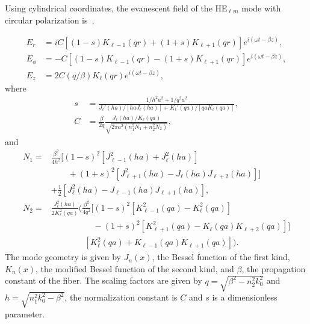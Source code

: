 Using cylindrical coordinates, the evanescent field of the HE$_{\ell m}$ mode with circular polarization is~\cite{minogin2010},

\begin{align}
        E_r &= iC[(1-s)K_{\ell-1}(qr) + (1+s)K_{\ell+1}(qr)]e^{i(\omega t- \beta z)}, \\
        E_\phi &= -C[(1-s)K_{\ell-1}(qr) - (1+s)K_{\ell+1}(qr)]e^{i(\omega t- \beta z)}, \\
        E_z &= 2C(q/\beta)K_\ell(qr)e^{i(\omega t - \beta z)},
\end{align}
where
\begin{align}
        s &= \frac{1/h^2a^2 + 1/q^2a^2}{J_\ell'(ha)/[haJ_\ell(ha)]+K_\ell'(qa)/[qaK_\ell(qa)]}, \\
        C &= \frac{\beta}{2q}\frac{J_\ell(ha)/K_\ell(qa)}{\sqrt{2\pi a^2(n_1^2N_1+n_2^2N_2)}},
\end{align}
and 
\begin{align}
N_1 =&\frac{\beta^2}{4h^2}\Big[(1-s)^2\left[J_{\ell-1}^2(ha)+J_\ell^2(ha)\right]\nonumber \\
   & \qquad+(1+s)^2\left[J_{\ell+1}^2(ha)-J_\ell(ha)J_{\ell+2}(ha)\right]\Big] \nonumber\\
   & +\frac12\left[J_\ell^2(ha) - J_{\ell-1}(ha)J_{\ell+1}(ha)\right], \\
N_2 =& \frac{J_\ell^2(ha)}{2K_\ell^2(qa)}\Bigg( \frac{\beta^2}{4q^2}\Big[(1-s)^2\left[K_{\ell-1}^2(qa)-K_\ell^2(qa)\right] \nonumber\\
   & \qquad\qquad\quad-(1+s)^2\left[K_{\ell+1}^2(qa)-K_\ell(qa)K_{\ell+2}(qa)\right]\Big] \nonumber\\
   & \qquad\qquad \left[K_\ell^2(qa) + K_{\ell-1}(qa)K_{\ell+1}(qa)\right]\Bigg ).
\end{align}
The mode geometry is given by $J_n(x)$, the Bessel function of the first kind, $K_n(x)$, the modified Bessel function of the second kind, and $\beta$, the propagation constant of the fiber.
The scaling factors are given by $q = \sqrt{\beta^2-n_2^2k_0^2}$ and $h = \sqrt{n_1^2k_0^2 - \beta^2}$, the normalization constant is $C$ and $s$ is a dimensionless parameter.

